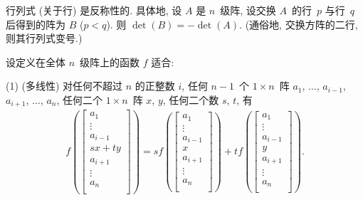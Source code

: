 \begin{theorem}[反称性]
    行列式 (关于行) 是反称性的.
    具体地,
    设 \(A\) 是 \(n\)~级阵,
    设交换 \(A\)~的行~\(p\) 与行~\(q\) 后得到的阵为 \(B\)
    (\(p < q\)).
    则 \(\det {(B)} = -\det {(A)}\).
    (通俗地, 交换方阵的二行, 则其行列式变号.)
\end{theorem}

\begin{theorem}
    设定义在全体 \(n\)~级阵上的函数 \(f\) 适合:

    (1)
    (多线性)
    对任何不超过 \(n\) 的正整数 \(i\),
    任何 \(n-1\)~个 \(1 \times n\)~阵
    \(a_1\), \(\dots\), \(a_{i-1}\),
    \(a_{i+1}\), \(\dots\), \(a_n\),
    任何二个 \(1 \times n\)~阵 \(x\), \(y\),
    任何二个数 \(s\), \(t\),
    有
    \begin{align*}
        f
        {\left(\begin{bmatrix}
                       a_1     \\
                       \vdots  \\
                       a_{i-1} \\
                       sx + ty \\
                       a_{i+1} \\
                       \vdots  \\
                       a_{n}   \\
                   \end{bmatrix}\right)}
        =
        s
        f
            {\left(\begin{bmatrix}
                               a_1     \\
                               \vdots  \\
                               a_{i-1} \\
                               x       \\
                               a_{i+1} \\
                               \vdots  \\
                               a_{n}   \\
                           \end{bmatrix}\right)}
        +
        t
        f
            {\left(\begin{bmatrix}
                               a_1     \\
                               \vdots  \\
                               a_{i-1} \\
                               y       \\
                               a_{i+1} \\
                               \vdots  \\
                               a_{n}   \\
                           \end{bmatrix}\right)}.
    \end{align*}


\end{theorem}
